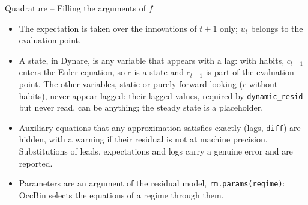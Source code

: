 \documentclass[11pt,aspectratio=169]{beamer}
\newcommand{\code}[1]{\texttt{#1}}
\begin{document}
\begin{frame}{Quadrature -- Filling the arguments of $f$}

\begin{itemize}

\item The expectation is taken over the innovations of $t+1$ only; $u_t$ belongs to the evaluation point.\newline

\item A state, in Dynare, is any variable that appears with a lag: with habits, $c_{t-1}$ enters the Euler equation, so $c$ is a state and $c_{t-1}$ is part of the evaluation point. The other variables, static or purely forward looking ($c$ without habits), never appear lagged: their lagged values, required by \code{dynamic\_resid} but never read, can be anything; the steady state is a placeholder.\newline

\item Auxiliary equations that any approximation satisfies exactly (lags, \code{diff}) are hidden, with a warning if their residual is not at machine precision. Substitutions of leads, expectations and logs carry a genuine error and are reported.\newline

\item Parameters are an argument of the residual model, \code{rm.params(regime)}: OccBin selects the equations of a regime through them.

\end{itemize}

\end{frame}
\end{document}
